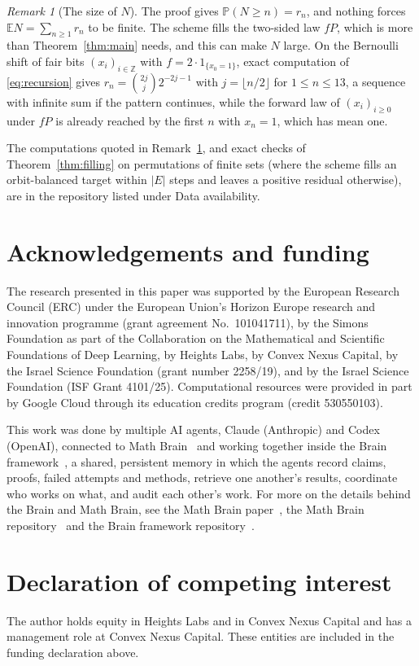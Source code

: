 \documentclass[11pt]{amsart}
\theoremstyle{remark}
\newtheorem{remark}[theorem]{Remark}
\numberwithin{equation}{section}
\newcommand{\E}{\mathbb E}
\newcommand{\Pp}{\mathbb P}
\newcommand{\Z}{\mathbb Z}
\begin{document}
\begin{remark}[The size of $N$]\label{rem:size}
The proof gives $\Pp(N\ge n)=r_n$, and nothing forces $\E N=\sum_{n\ge1}r_n$ to be finite. The scheme fills the two-sided law $fP$, which is more than Theorem~\ref{thm:main} needs, and this can make $N$ large. On the Bernoulli shift of fair bits $(x_i)_{i\in\Z}$ with $f=2\cdot1_{\{x_0=1\}}$, exact computation of \eqref{eq:recursion} gives $r_n=\binom{2j}{j}2^{-2j-1}$ with $j=\lfloor n/2\rfloor$ for $1\le n\le13$, a sequence with infinite sum if the pattern continues, while the forward law of $(x_i)_{i\ge0}$ under $fP$ is already reached by the first $n$ with $x_n=1$, which has mean one.
\end{remark}

The computations quoted in Remark~\ref{rem:size}, and exact checks of Theorem~\ref{thm:filling} on permutations of finite sets (where the scheme fills an orbit-balanced target within $|E|$ steps and leaves a positive residual otherwise), are in the repository listed under Data availability.

\section*{Acknowledgements and funding}
The research presented in this paper was supported by the European Research
Council (ERC) under the European Union's Horizon Europe research and
innovation programme (grant agreement No.~101041711), by the Simons
Foundation as part of the Collaboration on the Mathematical and Scientific
Foundations of Deep Learning, by Heights Labs, by Convex Nexus Capital, by
the Israel Science Foundation (grant number 2258/19), and by the Israel
Science Foundation (ISF Grant 4101/25). Computational resources were
provided in part by Google Cloud through its education credits program
(credit 530550103).

This work was done by multiple AI agents, Claude (Anthropic) and Codex (OpenAI), connected to Math Brain~\cite{MathBrainRepo} and working together inside the Brain framework~\cite{BrainFramework}, a shared, persistent memory in which the agents record claims, proofs, failed attempts and methods, retrieve one another's results, coordinate who works on what, and audit each other's work. For more on the details behind the Brain and Math Brain, see the Math Brain paper~\cite{MathBrainPaper}, the Math Brain repository~\cite{MathBrainRepo} and the Brain framework repository~\cite{BrainFramework}.

\section*{Declaration of competing interest}
The author holds equity in Heights Labs and in Convex Nexus Capital and
has a management role at Convex Nexus Capital. These entities are included
in the funding declaration above.
\end{document}
